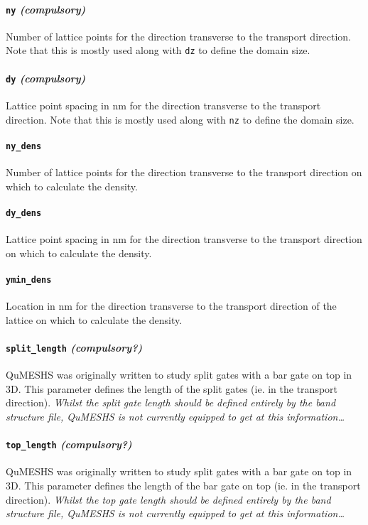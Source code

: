 \documentclass[12pt]{article}
\newcommand{\red}[1]{{\color{red} \it #1}}
\begin{document}
\paragraph{\texttt{ny} \emph{(compulsory)}}
Number of lattice points for the direction transverse to the transport direction.  Note
that this is mostly used along with \texttt{dz} to define the domain size.

\paragraph{\texttt{dy} \emph{(compulsory)}}
Lattice point spacing in nm for the direction transverse to the transport direction.
Note that this is mostly used along with \texttt{nz} to define the domain size.

\paragraph{\texttt{ny\_dens}}
Number of lattice points for the direction transverse to the transport direction on which
to calculate the density.

\paragraph{\texttt{dy\_dens}}
Lattice point spacing in nm for the direction transverse to the transport direction on
which to calculate the density.

\paragraph{\texttt{ymin\_dens}}
Location in nm for the direction transverse to the transport direction of the lattice on
which to calculate the density.

\paragraph{\texttt{split\_length} \emph{(compulsory?)}}
QuMESHS was originally written to study split gates with a bar gate on top in 3D.  This
parameter defines the length of the split gates (ie. in the transport direction).
\red{Whilst the split gate length should be defined entirely by the band structure file,
QuMESHS is not currently equipped to get at this information\ldots}

\paragraph{\texttt{top\_length} \emph{(compulsory?)}}
QuMESHS was originally written to study split gates with a bar gate on top in 3D.  This
parameter defines the length of the bar gate on top (ie. in the transport direction).
\red{Whilst the top gate length should be defined entirely by the band structure file,
QuMESHS is not currently equipped to get at this information\ldots}
\end{document}
